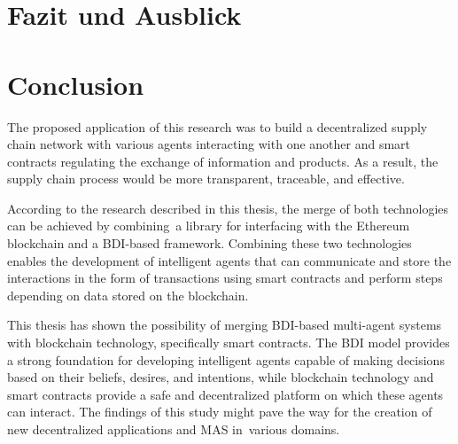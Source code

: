 {\chapter{Fazit und Ausblick}}
{\chapter{Conclusion}}

\label{sec:conclusion}

The proposed application of this research was to build a decentralized supply chain network with various agents interacting with one another and smart contracts regulating the exchange of information and products. As a result, the supply chain process would be more transparent, traceable, and effective. 

\vspace{.5cm}

According to the research described in this thesis, the merge of both technologies can be achieved by combining a library for interfacing with the Ethereum blockchain and a \ac{BDI}-based framework. Combining these two technologies enables the development of intelligent agents that can communicate and store the interactions in the form of transactions using smart contracts and perform steps depending on data stored on the blockchain.

\vspace{.5cm}

This thesis has shown the possibility of merging \ac{BDI}-based multi-agent systems with blockchain technology, specifically smart contracts. The \ac{BDI} model provides a strong foundation for developing intelligent agents capable of making decisions based on their beliefs, desires, and intentions, while blockchain technology and smart contracts provide a safe and decentralized platform on which these agents can interact. The findings of this study might pave the way for the creation of new decentralized applications and \ac{MAS} in various domains.



